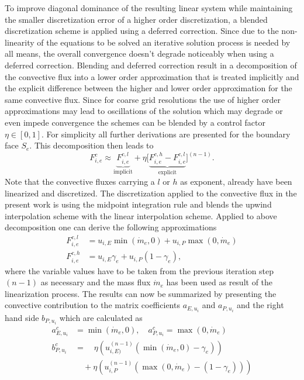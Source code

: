       To improve diagonal dominance of the resulting linear system while maintaining the smaller discretization error of a higher order discretization, a blended discretization scheme is applied using a deferred correction. Since due to the non-linearity of the equations to be solved an iterative solution process is needed by all means, the overall convergence doesn't degrade noticeably when using a deferred correction. Blending and deferred correction result in a decomposition of the convective flux into a lower order approximation that is treated implicitly and the explicit difference between the higher and lower order approximation for the same convective flux. Since for coarse grid resolutions the use of higher order approximations may lead to oscillations of the solution which may degrade or even impede convergence the schemes can be blended by a control factor \( \eta \in [0,1]\). For simplicity all further derivations are presented for the boundary face \(S_e\). This decomposition then leads to
      \begin{displaymath}
        F_{i,e}^c \approx  \underbrace{F_{i,e}^{c,l}}_{\text{implicit}} + \eta \bigl[\underbrace{ F_{i,e}^{c,h} - F_{i,e}^{c,l} }_{\text{explicit}}\bigr]^{(n-1)}.
      \end{displaymath}
      Note that the convective fluxes carrying a \(l\) or \(h\) as exponent, already have been linearized and discretized. The discretization applied to the convective flux in the present work is using the midpoint integration rule and blends the upwind interpolation scheme with the linear interpolation scheme. Applied to above decomposition one can derive the following approximations
      \begin{align*}
        F_{i,e}^{c,l} &= u_{i,E} \min(\dot{m}_e ,0) + u_{i,P} \max(0,\dot{m}_e) \\
        F_{i,e}^{c,h} &= u_{i,E} \gamma_e + u_{i,P} (1 - \gamma_e),
      \end{align*}
      where the variable values have to be taken from the previous iteration step \((n-1)\) as necessary and the mass flux \(\dot{m}_e\) has been used as result of the linearization process. The results can now be summarized by presenting the convective contribution to the matrix coefficients \(a_{E,u_i}\) and \(a_{P,u_i}\) and the right hand side \(b_{P,u_i}\) which are calculated as
      \begin{align}
        a_{E,u_i}^c &= \min(\dot{m}_e ,0), \quad a_{P,u_i}^c = \max(0,\dot{m}_e) \\
        b_{P,u_i}^c &= \quad \eta  \left(u_{i,E)}^{(n-1)} \left( \min(\dot{m}_e,0) - \gamma_e \right)\right) \\
                    &\quad + \eta \left( u_{i,P}^{(n-1)} \left( \max(0,\dot{m}_e) - \left(1 - \gamma_e\right) \right)\right)
      \end{align}

